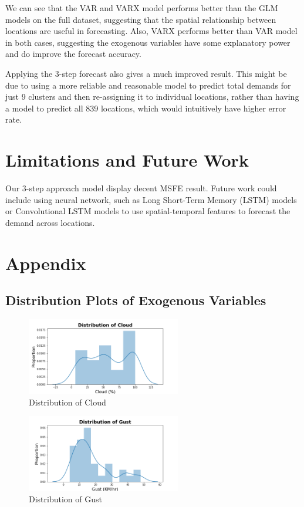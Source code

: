 \documentclass[12pt, letterpaper] {article}
\begin{document}
\noindent We can see that the VAR and VARX model performs better than the GLM models on the full dataset, suggesting that the spatial relationship between locations are useful in forecasting. Also, VARX performs better than VAR model in both cases, suggesting the exogenous variables have some explanatory power and do improve the forecast accuracy. 

\noindent Applying the 3-step forecast also gives a much improved result. This might be due to using a more reliable and reasonable model to predict total demands for just 9 clusters and then re-assigning it to individual locations, rather than having a model to predict all 839 locations, which would intuitively have higher error rate. 

\section{Limitations and Future Work}
Our 3-step approach model display decent MSFE result. Future work could include using neural network, such as Long Short-Term Memory (LSTM) models or Convolutional LSTM models to use spatial-temporal features to forecast the demand across locations.

\section{Appendix}
\subsection{Distribution Plots of Exogenous Variables}
\begin{figure}[H]
    \centering
    \includegraphics[width=0.6\textwidth, height=0.3\textheight]{Images/distplot_cloud.png}
    \caption{Distribution of Cloud}
    \label{fig:Distribution of Cloud}
\end{figure}

\begin{figure}[H]
    \centering
    \includegraphics[width=0.6\textwidth, height=0.3\textheight]{Images/distplot_gust.png}
    \caption{Distribution of Gust}
    \label{fig:Distribution of Gust}
\end{figure}
\end{document}
